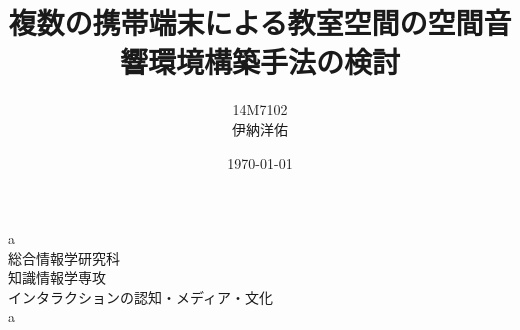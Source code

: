 \documentclass[11pt]{jreport}
\title{複数の携帯端末による教室空間の空間音響環境構築手法の検討}
\author{14M7102\\伊納洋佑}
\date{\today}
\newcommand{\thetitle}{a}
\newcommand{\theauthor}{a}
\begin{document}
  \thispagestyle{empty}
  \begin{center}
    \vspace{1.5cm}\huge{\thetitle}\\ \vspace{3.0cm}
    \LARGE{総合情報学研究科}\\
    \LARGE{知識情報学専攻}\\
    \vspace{0.8cm}\Large{インタラクションの認知・メディア・文化}\\
    \vspace{0.8cm}\LARGE{\theauthor}\\ \vspace{1.0cm}
  \end{center}

\def\thepage{}
  
  \tableofcontents
  \listoftables
  \listoffigures

\pagestyle{fancy}
  
  
  
  
  
  
  
  
  
  
\end{document}
